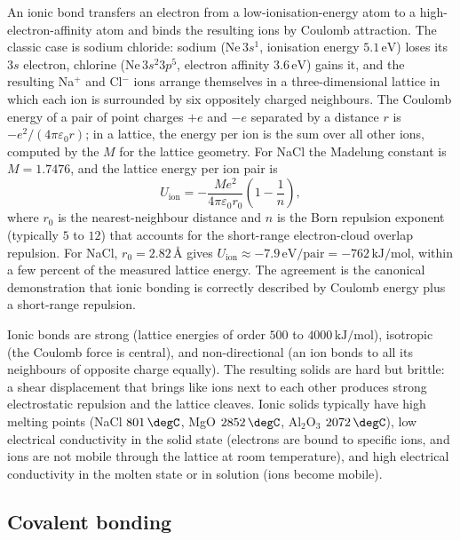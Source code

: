An ionic bond transfers an electron from a low-ionisation-energy atom
to a high-electron-affinity atom and binds the resulting ions by
Coulomb attraction. The classic case is sodium chloride: sodium
($\text{Ne}\,3s^1$, ionisation energy $5.1\,\text{eV}$) loses its
$3s$ electron, chlorine ($\text{Ne}\,3s^2 3p^5$, electron affinity
$3.6\,\text{eV}$) gains it, and the resulting Na$^+$ and Cl$^-$ ions
arrange themselves in a three-dimensional lattice in which each ion is
surrounded by six oppositely charged neighbours. The Coulomb energy of
a pair of point charges $+e$ and $-e$ separated by a distance $r$ is
$-e^2/(4\pi\varepsilon_0 r)$; in a lattice, the energy per ion is the
sum over all other ions, computed by the 
$M$ for the lattice geometry. For NaCl the Madelung constant is
$M = 1.7476$, and the lattice energy per ion pair is
\[
U_{\text{ion}} = -\frac{M e^2}{4\pi\varepsilon_0 r_0}\left(1 -
\frac{1}{n}\right),
\]
where $r_0$ is the nearest-neighbour distance and $n$ is the Born
repulsion exponent (typically $5$ to $12$) that accounts for the
short-range electron-cloud overlap repulsion. For NaCl, $r_0 = 2.82\,
\si{\angstrom}$ gives $U_{\text{ion}} \approx -7.9\,\text{eV}/\text{pair}
= -762\,\text{kJ}/\text{mol}$, within a few percent of the measured
lattice energy. The agreement is the canonical demonstration that
ionic bonding is correctly described by Coulomb energy plus a
short-range repulsion.

Ionic bonds are strong (lattice energies of order $500$ to $4000\,
\text{kJ}/\text{mol}$), isotropic (the Coulomb force is central), and
non-directional (an ion bonds to all its neighbours of opposite
charge equally). The resulting solids are hard but brittle: a shear
displacement that brings like ions next to each other produces strong
electrostatic repulsion and the lattice cleaves. Ionic solids
typically have high melting points (NaCl $801\,\degC$, MgO $2852\,
\degC$, Al$_2$O$_3$ $2072\,\degC$), low electrical conductivity in
the solid state (electrons are bound to specific ions, and ions are
not mobile through the lattice at room temperature), and high
electrical conductivity in the molten state or in solution (ions
become mobile).

\subsection{Covalent bonding}


